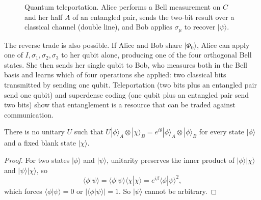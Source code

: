 \begin{figure}[ht]
\centering
{}
\caption{Quantum teleportation. Alice performs a Bell measurement on $C$ and her half $A$ of an entangled pair, sends the two-bit result over a classical channel (double line), and Bob applies $\sigma_\mu$ to recover $|\psi\rangle$.}
\end{figure}

\begin{example}
The reverse trade is also possible. If Alice and Bob share $|\Phi_0\rangle$, Alice can apply one of $I,\sigma_1,\sigma_2,\sigma_3$ to her qubit alone, producing one of the four orthogonal Bell states. She then sends her single qubit to Bob, who measures both in the Bell basis and learns which of four operations she applied: two classical bits transmitted by sending one qubit. Teleportation (two bits plus an entangled pair send one qubit) and superdense coding (one qubit plus an entangled pair send two bits) show that entanglement is a resource that can be traded against communication.
\end{example}

\begin{theorem}
There is no unitary $U$ such that $U|\phi\rangle_A\otimes|\chi\rangle_B = e^{i\theta}|\phi\rangle_A\otimes|\phi\rangle_B$ for every state $|\phi\rangle$ and a fixed blank state $|\chi\rangle$.
\end{theorem}
\begin{proof}
For two states $|\phi\rangle$ and $|\psi\rangle$, unitarity preserves the inner product of $|\phi\rangle|\chi\rangle$ and $|\psi\rangle|\chi\rangle$, so
\[
    \langle\phi|\psi\rangle = \langle\phi|\psi\rangle\langle\chi|\chi\rangle = e^{i\beta}\langle\phi|\psi\rangle^2,
\]
which forces $\langle\phi|\psi\rangle = 0$ or $|\langle\phi|\psi\rangle| = 1$. So $|\psi\rangle$ cannot be arbitrary.
\end{proof}

